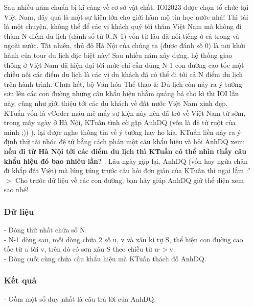 







   Sau nhiều năm chuẩn bị kĩ càng về cơ sở vật chất, IOI2023 được chọn tổ chức tại Việt Nam, đây quả là một sự kiện lớn cho giới hâm mộ tin học nước nhà! Thi tài là một chuyện, không thể để các vị khách quý tới thăm Việt Nam mà không đi thăm N điểm du lịch (đánh số từ 0..N-1) vốn từ lâu đã nổi tiếng ở cả trong và ngoài nước. Tất nhiên, thủ đô Hà Nội của chúng ta (được đánh số 0) là nơi khởi hành của tour du lịch đặc biệt này! Sau nhiều năm xây dựng, hệ thống giao thông ở Việt Nam đã hiện đại tới mức chỉ cần đúng N-1 con đường cao tốc một chiều nối các điểm du lịch là các vị du khách đã có thể đi tới cả N điểm du lịch trên hành trình. Chưa hết, bộ Văn hóa Thể thao \& Du lịch còn nảy ra ý tưởng sơn lên các con đường những câu khẩu hiệu nhằm quảng bá cho kì thi IOI lần này, cũng như giới thiệu tới các du khách về đất nước Việt Nam xinh đẹp. KTuấn vốn là vCoder máu mê mấy sự kiện này nên đã trở về Việt Nam từ sớm, trong mấy ngày ở Hà Nội, KTuấn tình cờ gặp AnhDQ (vốn là đệ tử ruột của mình ;)) ), lại được nghe thông tin về ý tưởng hay ho kia, KTuấn liền nảy ra ý định thử tài nhóc đệ tử bằng cách phán một câu khẩu hiệu và hỏi AnhDQ xem:   \textbf{    nếu đi từ Hà Nội tới các điểm du lịch thì KTuấn có thể nhìn thấy câu khẩu hiệu đó bao nhiêu lần?   }   . Lâu ngày gặp lại, AnhDQ (vốn hay ngứa chân đi khắp đất Việt) mà lúng túng trước câu hỏi đơn giản của KTuấn thì ngại lắm :"$>$ Cho trước dữ liệu về các con đường, bạn hãy giúp AnhDQ giữ thể diện xem sao nhé!  

\subsubsection{   Dữ liệu  }

   - Dòng thứ nhất chứa số N.   
\\   - N-1 dòng sau, mỗi dòng chứa 2 số u, v và xâu kí tự S, thể hiện con đường cao tốc từ u tới v, trên đó có sơn xâu S theo chiều từ u-$>$v.   
\\   - Dòng cuối cùng chứa câu khẩu hiệu mà KTuấn thách đố AnhDQ.  

\subsubsection{   Kết quả  }

   - Gồm một số duy nhất là câu trả lời của AnhDQ.  

